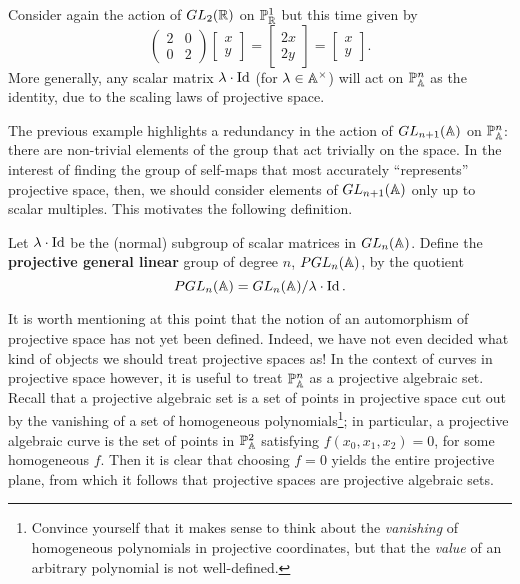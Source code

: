 \documentclass{../../mathnotes}
\begin{document}
\begin{exmp}
    Consider again the action of $GL_2(\mathbb{R})$ on $\mathbb{P}^1_{\mathbb{R}}$ but this time given by 
    \[\begin{pmatrix}
        2&0\\
        0&2
    \end{pmatrix}
    \begin{bmatrix}
        x\\y
    \end{bmatrix}
    =
    \begin{bmatrix}
        2x\\2y
    \end{bmatrix}
    =
    \begin{bmatrix}
        x\\y    
    \end{bmatrix}.\] More generally, any scalar matrix $\lambda\cdot\operatorname{Id}$ (for $\lambda\in\mathbb{A}^\times$) will act on $\mathbb{P}^n_{\mathbb{A}}$
    as the identity, due to the scaling laws of projective space.
\end{exmp}

The previous example highlights a redundancy in the action of $GL_{n+1}(\mathbb{A})$ on $\mathbb{P}^n_{\mathbb{A}}$: there are non-trivial elements of the group
that act trivially on the space. In the interest of finding the group of self-maps that most accurately ``represents'' projective space, then,
we should consider elements of $GL_{n+1}(\mathbb{A})$ only up to scalar multiples. This motivates the following definition.

\begin{defn}
    Let $\lambda\cdot \operatorname{Id}$ be the (normal) subgroup of scalar matrices in $GL_{n}(\mathbb{A})$. Define the \textbf{projective general linear} group
    of degree $n$, $PGL_n(\mathbb{A})$, by the quotient
    \[PGL_{n}(\mathbb{A})=GL_n(\mathbb{A})/\lambda\cdot\operatorname{Id}.\]
\end{defn}

It is worth mentioning at this point that the notion of an automorphism of projective space has not yet been defined. Indeed, we have not
even decided what kind of objects we should treat projective spaces as! In the context of curves in projective space however,
it is useful to treat $\mathbb{P}^n_{\mathbb{A}}$ as a projective algebraic set. Recall that a projective algebraic set is a set of points in projective
space cut out by the vanishing of a set of homogeneous polynomials\footnote{Convince yourself that it makes sense to think about the
    \textit{vanishing} of homogeneous polynomials in projective coordinates, but that the \textit{value} of an arbitrary polynomial is not well-defined.};
in particular, a projective algebraic curve is the set of points in
$\mathbb{P}^2_{\mathbb{A}}$ satisfying $f(x_0,x_1,x_2)=0$, for some homogeneous $f$. Then it is clear that choosing $f=0$ yields the entire projective plane,
from which it follows that projective spaces are projective algebraic sets.
\end{document}
